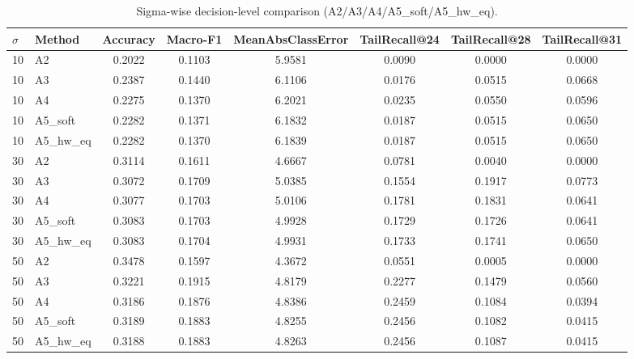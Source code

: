 \begin{table}[t]
\centering
\caption{Sigma-wise decision-level comparison (A2/A3/A4/A5\_soft/A5\_hw\_eq).}
\label{tab:sigma_decision}
\setlength{\tabcolsep}{4pt}
\begin{tabular}{llcccccc}
\toprule
$\sigma$ & Method & Accuracy & Macro-F1 & MeanAbsClassError & TailRecall@24 & TailRecall@28 & TailRecall@31 \\
\midrule
10 & A2 & 0.2022 & 0.1103 & 5.9581 & 0.0090 & 0.0000 & 0.0000 \\
10 & A3 & 0.2387 & 0.1440 & 6.1106 & 0.0176 & 0.0515 & 0.0668 \\
10 & A4 & 0.2275 & 0.1370 & 6.2021 & 0.0235 & 0.0550 & 0.0596 \\
10 & A5\_soft & 0.2282 & 0.1371 & 6.1832 & 0.0187 & 0.0515 & 0.0650 \\
10 & A5\_hw\_eq & 0.2282 & 0.1370 & 6.1839 & 0.0187 & 0.0515 & 0.0650 \\
30 & A2 & 0.3114 & 0.1611 & 4.6667 & 0.0781 & 0.0040 & 0.0000 \\
30 & A3 & 0.3072 & 0.1709 & 5.0385 & 0.1554 & 0.1917 & 0.0773 \\
30 & A4 & 0.3077 & 0.1703 & 5.0106 & 0.1781 & 0.1831 & 0.0641 \\
30 & A5\_soft & 0.3083 & 0.1703 & 4.9928 & 0.1729 & 0.1726 & 0.0641 \\
30 & A5\_hw\_eq & 0.3083 & 0.1704 & 4.9931 & 0.1733 & 0.1741 & 0.0650 \\
50 & A2 & 0.3478 & 0.1597 & 4.3672 & 0.0551 & 0.0005 & 0.0000 \\
50 & A3 & 0.3221 & 0.1915 & 4.8179 & 0.2277 & 0.1479 & 0.0560 \\
50 & A4 & 0.3186 & 0.1876 & 4.8386 & 0.2459 & 0.1084 & 0.0394 \\
50 & A5\_soft & 0.3189 & 0.1883 & 4.8255 & 0.2456 & 0.1082 & 0.0415 \\
50 & A5\_hw\_eq & 0.3188 & 0.1883 & 4.8263 & 0.2456 & 0.1087 & 0.0415 \\
\bottomrule
\end{tabular}
\end{table}
